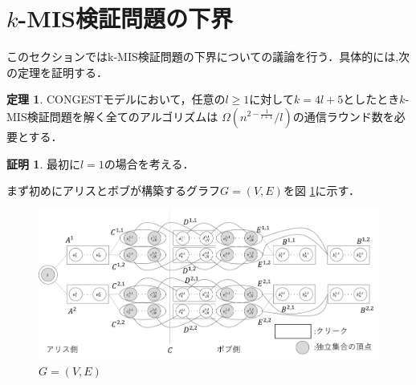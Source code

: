 \documentclass[12pt]{thesis}
\newcommand{\CONGEST}{\textsf{CONGEST}}
\theoremstyle{definition}
\newtheorem{theorem}{定理}[chapter]
\newtheorem*{prf*}{証明}
\begin{document}
\section{$k$-MIS検証問題の下界}
このセクションではk-MIS検証問題の下界についての議論を行う．具体的には,次の定理を証明する．
\begin{theorem}
{\CONGEST}モデルにおいて，任意の$l \geq 1$に対して$k = 4l + 5$としたとき$k$-MIS検証問題を解く全てのアルゴリズムは
$\Omega\left(n^{2 - \frac{1}{l+1}}/l\right)$の通信ラウンド数を必要とする．
\end{theorem}

\begin{prf*}
最初に$l = 1$の場合を考える．

まず初めにアリスとボブが構築するグラフ$G = (V, E)$を図 \ref{k_G}に示す．

\begin{figure}[ht]
\begin{center}
\includegraphics[width=120mm]{k_G.png}
\end{center}
\caption{$G = (V, E)$}
\label{k_G}
\end{figure}


\end{prf*}
\end{document}

